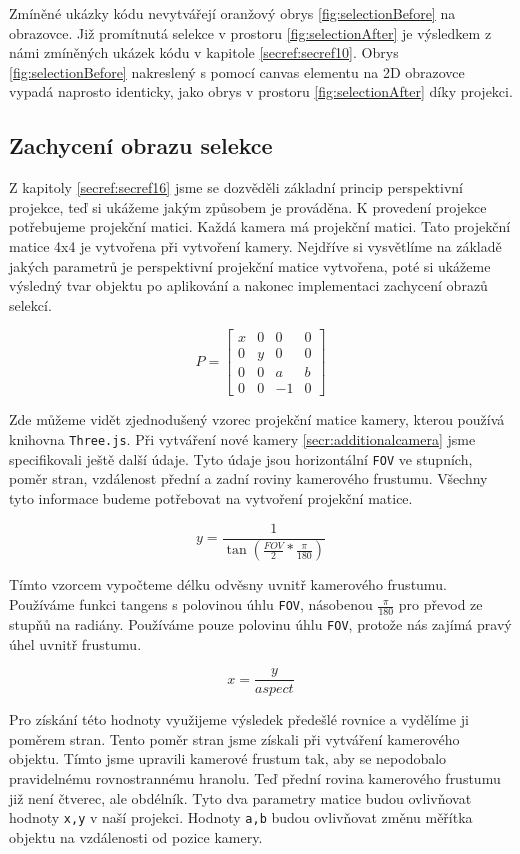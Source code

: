 \documentclass[czech,bachelor,dept420,male,cpdeclaration]{diploma}
\begin{document}
Zmíněné ukázky kódu nevytvářejí oranžový obrys \ref{fig:selectionBefore} na obrazovce. Již promítnutá selekce v prostoru \ref{fig:selectionAfter} je výsledkem z námi zmíněných ukázek kódu v kapitole \ref{secref:secref10}. Obrys \ref{fig:selectionBefore} nakreslený s pomocí canvas elementu na 2D obrazovce vypadá naprosto identicky, jako obrys v prostoru \ref{fig:selectionAfter} díky projekci.


\subsection{Zachycení obrazu selekce}\label{secref:secref13} 
Z kapitoly \ref{secref:secref16} jsme se dozvěděli základní princip perspektivní projekce, teď si ukážeme jakým způsobem je prováděna. K provedení projekce potřebujeme projekční matici. Každá kamera má projekční matici. Tato projekční matice 4x4 je vytvořena při vytvoření kamery. Nejdříve si vysvětlíme na základě jakých parametrů je perspektivní projekční matice vytvořena, poté si ukážeme výsledný tvar objektu po aplikování a nakonec implementaci zachycení obrazů selekcí. 

\begin{equation}
		P =
		\begin{bmatrix}%
    x & 0 & 0 & 0 \\
		0 & y & 0 & 0 \\ 
		0 & 0 & a & b \\
		0 & 0 & -1 & 0 
    \end{bmatrix}
\label{eq:eq4}
\end{equation}


 Zde můžeme vidět zjednodušený vzorec projekční matice kamery, kterou používá knihovna \texttt{Three.js}. Při vytváření nové kamery \ref{secr:additionalcamera} jsme specifikovali ještě další údaje. Tyto údaje jsou horizontální \texttt{FOV} ve stupních, poměr stran, vzdálenost přední a zadní roviny kamerového frustumu. Všechny tyto informace budeme potřebovat na vytvoření projekční matice. 

$$y = \frac{1}{\tan(\frac{FOV}{2} * \frac{\pi}{180})}$$ 

Tímto vzorcem vypočteme délku odvěsny uvnitř kamerového frustumu. Používáme funkci tangens s polovinou úhlu \texttt{FOV}, násobenou $\frac{\pi}{180}$ pro převod ze stupňů na radiány. Používáme pouze polovinu úhlu \texttt{FOV}, protože nás zajímá pravý úhel uvnitř frustumu. 

$$x = \frac{y}{aspect}$$ 

Pro získání této hodnoty využijeme výsledek předešlé rovnice a vydělíme ji poměrem stran. Tento poměr stran jsme získali při vytváření kamerového objektu. Tímto jsme upravili kamerové frustum tak, aby se nepodobalo pravidelnému rovnostrannému hranolu. Teď přední rovina kamerového frustumu již není čtverec, ale obdélník. Tyto dva parametry matice budou ovlivňovat hodnoty \texttt{x,y} v naší projekci. Hodnoty \texttt{a,b} budou ovlivňovat změnu měřítka objektu na vzdálenosti od pozice kamery. 
\end{document}
